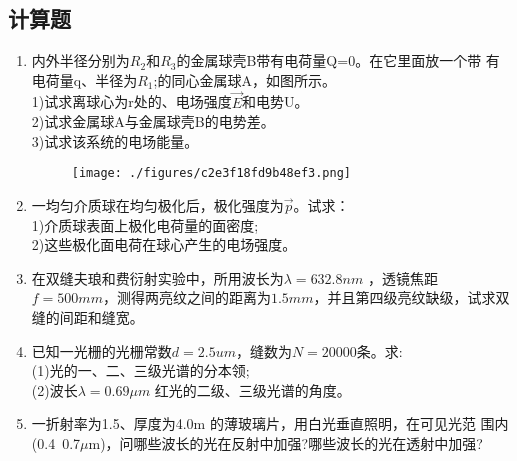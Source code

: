 \subsection{计算题}
\begin{enumerate}
\item 内外半径分别为$R_2$和$R_3$的金属球壳B带有电荷量Q=0。在它里面放一个带
有电荷量q、半径为$R_1$;的同心金属球A，如图所示。\\
1)试求离球心为r处的、电场强度$\vec E$和电势U。\\
2)试求金属球A与金属球壳B的电势差。\\
3)试求该系统的电场能量。\\
\begin{figure}[ht]
\centering
\texttt{[image: ./figures/c2e3f18fd9b48ef3.png]}
\caption{} \label{fig_CD09_4}
\end{figure}
\item 一均匀介质球在均匀极化后，极化强度为$\vec p$。试求：\\
1)介质球表面上极化电荷量的面密度;\\
2)这些极化面电荷在球心产生的电场强度。
\item 在双缝夫琅和费衍射实验中，所用波长为$\lambda=632.8nm$ ，透镜焦距
$f=500mm$，测得两亮纹之间的距离为$1.5mm$，并且第四级亮纹缺级，试求双缝的间距和缝宽。
\item 已知一光栅的光栅常数$d=2.5um$，缝数为$N=20000$条。求:\\
(1)光的一、二、三级光谱的分本领;\\
(2)波长$\lambda=0.69\mu m$ 红光的二级、三级光谱的角度。
\item 一折射率为1.5、厚度为4.0\mu m 的薄玻璃片，用白光垂直照明，在可见光范
围内(0.4~0.7$\mu$m)，问哪些波长的光在反射中加强?哪些波长的光在透射中加强?
\end{enumerate}

